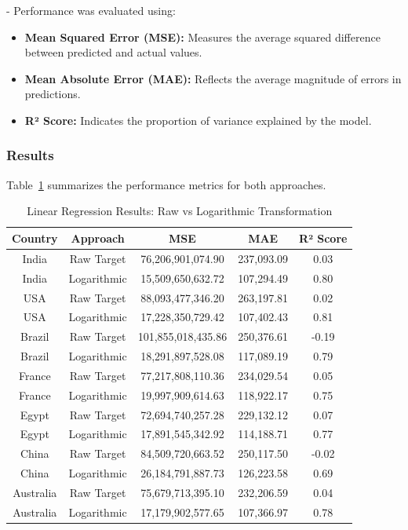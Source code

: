 \documentclass{article}
\begin{document}
- Performance was evaluated using:
\begin{itemize}
\item
\textbf{Mean Squared Error (MSE):} Measures the average squared difference between predicted and actual values.
\item
\textbf{Mean Absolute Error (MAE):} Reflects the average magnitude of errors in predictions.
\item
\textbf{R² Score:} Indicates the proportion of variance explained by the model.
\end{itemize}


\subsubsection{Results}
Table~\ref{tab:linear_regression_results} summarizes the performance metrics for both approaches.

\begin{table}[H]
\centering
\begin{tabular}{|c|c|c|c|c|}
\hline
\textbf{Country} & \textbf{Approach} & \textbf{MSE} & \textbf{MAE} & \textbf{R² Score} \\ \hline
India & Raw Target & 76,206,901,074.90 & 237,093.09 & 0.03 \\
India & Logarithmic & 15,509,650,632.72 & 107,294.49 & 0.80 \\ \hline
USA & Raw Target & 88,093,477,346.20 & 263,197.81 & 0.02 \\
USA & Logarithmic & 17,228,350,729.42 & 107,402.43 & 0.81 \\ \hline
Brazil & Raw Target & 101,855,018,435.86 & 250,376.61 & -0.19 \\
Brazil & Logarithmic & 18,291,897,528.08 & 117,089.19 & 0.79 \\ \hline
France & Raw Target & 77,217,808,110.36 & 234,029.54 & 0.05 \\
France & Logarithmic & 19,997,909,614.63 & 118,922.17 & 0.75 \\ \hline
Egypt & Raw Target & 72,694,740,257.28 & 229,132.12 & 0.07 \\
Egypt & Logarithmic & 17,891,545,342.92 & 114,188.71 & 0.77 \\ \hline
China & Raw Target & 84,509,720,663.52 & 250,117.50 & -0.02 \\
China & Logarithmic & 26,184,791,887.73 & 126,223.58 & 0.69 \\ \hline
Australia & Raw Target & 75,679,713,395.10 & 232,206.59 & 0.04 \\
Australia & Logarithmic & 17,179,902,577.65 & 107,366.97 & 0.78 \\ \hline
\end{tabular}
\caption{Linear Regression Results: Raw vs Logarithmic Transformation}
\label{tab:linear_regression_results}
\end{table}
\end{document}
